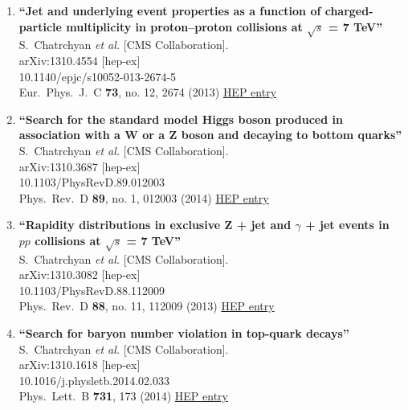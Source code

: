 \documentclass{article}
\begin{document}
\begin{enumerate}
\item%
{\bf ``Jet and underlying event properties as a function of charged-particle multiplicity in proton–proton collisions at $\sqrt{s}$ = 7 TeV''}
  \\{}S.~Chatrchyan {\it et al.} [CMS Collaboration].
  \\{}arXiv:1310.4554 [hep-ex]
    \\{}10.1140/epjc/s10052-013-2674-5
\\{}Eur.\ Phys.\ J.\ C {\bf 73}, no. 12, 2674 (2013) %
\href{http://inspirehep.net/record/1261026}{HEP entry}


\item%
{\bf ``Search for the standard model Higgs boson produced in association with a W or a Z boson and decaying to bottom quarks''}
  \\{}S.~Chatrchyan {\it et al.} [CMS Collaboration].
  \\{}arXiv:1310.3687 [hep-ex]
    \\{}10.1103/PhysRevD.89.012003
\\{}Phys.\ Rev.\ D {\bf 89}, no. 1, 012003 (2014) %
\href{http://inspirehep.net/record/1258399}{HEP entry}


\item%
{\bf ``Rapidity distributions in exclusive Z + jet and $\gamma$ + jet events in $pp$ collisions at $\sqrt{s}$ = 7 TeV''}
  \\{}S.~Chatrchyan {\it et al.} [CMS Collaboration].
  \\{}arXiv:1310.3082 [hep-ex]
    \\{}10.1103/PhysRevD.88.112009
\\{}Phys.\ Rev.\ D {\bf 88}, no. 11, 112009 (2013) %
\href{http://inspirehep.net/record/1258128}{HEP entry}


\item%
{\bf ``Search for baryon number violation in top-quark decays''}
  \\{}S.~Chatrchyan {\it et al.} [CMS Collaboration].
  \\{}arXiv:1310.1618 [hep-ex]
    \\{}10.1016/j.physletb.2014.02.033
\\{}Phys.\ Lett.\ B {\bf 731}, 173 (2014) %
\href{http://inspirehep.net/record/1257387}{HEP entry}



\end{enumerate}
\end{document}
